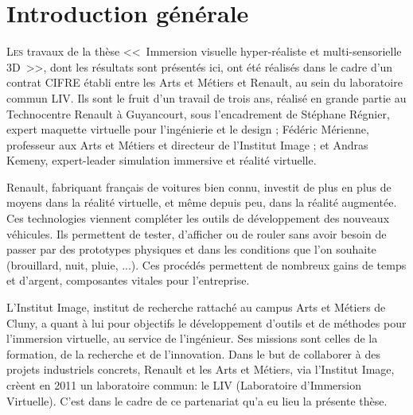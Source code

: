 \chapter*{Introduction générale}

\lettrine[lines=3]{L}{es} travaux de la thèse <<~Immersion visuelle hyper-réaliste et multi-sensorielle 3D~>>, dont les résultats sont présentés ici, ont été réalisés dans le cadre d’un contrat CIFRE établi entre les Arts et Métiers et Renault, au sein du laboratoire commun LIV. Ils sont le fruit d'un travail de trois ans, réalisé en grande partie au Technocentre Renault à Guyancourt, sous l'encadrement de Stéphane Régnier, expert maquette virtuelle pour l'ingénierie et le design ; Fédéric Mérienne, professeur aux Arts et Métiers et directeur de l'Institut Image ; et Andras Kemeny, expert-leader simulation immersive et réalité virtuelle.

\par Renault, fabriquant français de voitures bien connu, investit de plus en plus de moyens dans la réalité virtuelle, et même depuis peu, dans la réalité augmentée. Ces technologies viennent compléter les outils de développement des nouveaux véhicules. Ils permettent de tester, d'afficher ou de rouler sans avoir besoin de passer par des prototypes physiques et dans les conditions que l'on souhaite (brouillard, nuit, pluie, ...). Ces procédés permettent de nombreux gains de temps et d'argent, composantes vitales pour l'entreprise.

\par L'Institut Image, institut de recherche rattaché au campus Arts et Métiers de Cluny, a quant à lui pour objectifs le développement d'outils et de méthodes pour l'immersion virtuelle, au service de l'ingénieur. Ses missions sont celles de la formation, de la recherche et de l'innovation. Dans le but de collaborer à des projets industriels concrets, Renault et les Arts et Métiers, via l'Institut Image, crèent en 2011 un laboratoire commun: le LIV (Laboratoire d'Immersion Virtuelle). C'est dans le cadre de ce partenariat qu'a eu lieu la présente thèse.

